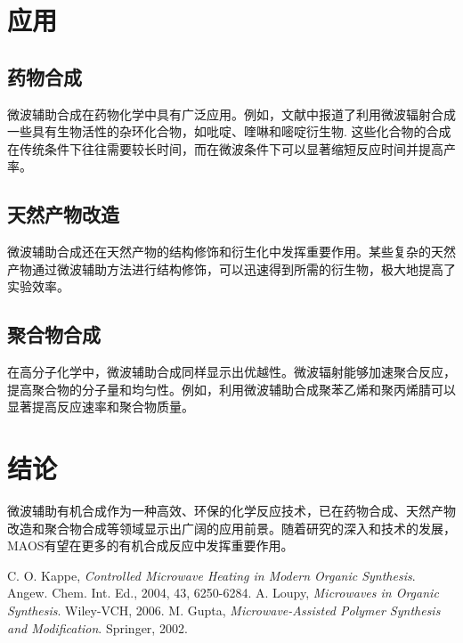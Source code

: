 \documentclass{article}
\begin{document}
\section*{应用}
\subsection*{药物合成}
微波辅助合成在药物化学中具有广泛应用。例如，文献中报道了利用微波辐射合成一些具有生物活性的杂环化合物，如吡啶、喹啉和嘧啶衍生物\cite{Kappe2004}. 这些化合物的合成在传统条件下往往需要较长时间，而在微波条件下可以显著缩短反应时间并提高产率。

\subsection*{天然产物改造}
微波辅助合成还在天然产物的结构修饰和衍生化中发挥重要作用。某些复杂的天然产物通过微波辅助方法进行结构修饰，可以迅速得到所需的衍生物，极大地提高了实验效率\cite{Loupy2006}。

\subsection*{聚合物合成}
在高分子化学中，微波辅助合成同样显示出优越性。微波辐射能够加速聚合反应，提高聚合物的分子量和均匀性。例如，利用微波辅助合成聚苯乙烯和聚丙烯腈可以显著提高反应速率和聚合物质量\cite{Gupta2002}。

\section*{结论}
微波辅助有机合成作为一种高效、环保的化学反应技术，已在药物合成、天然产物改造和聚合物合成等领域显示出广阔的应用前景。随着研究的深入和技术的发展，MAOS有望在更多的有机合成反应中发挥重要作用。

\begin{thebibliography}{9}
     C. O. Kappe, \textit{Controlled Microwave Heating in Modern Organic Synthesis}. Angew. Chem. Int. Ed., 2004, 43, 6250-6284.
     A. Loupy, \textit{Microwaves in Organic Synthesis}. Wiley-VCH, 2006.
     M. Gupta, \textit{Microwave-Assisted Polymer Synthesis and Modification}. Springer, 2002.
\end{thebibliography}
\end{document}
